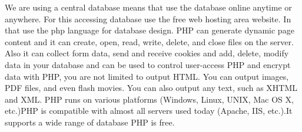 We are using a central database means that use the database online anytime or anywhere. For this accessing database use the free web hosting area website. In that use the php language for database design. PHP can generate dynamic page content and it can create, open, read, write, delete, and close files on the server. Also it can collect form data, send and receive cookies and add, delete, modify data in your database and can be used to control user-access PHP and encrypt data with PHP, you are not limited to output HTML. You can output images, PDF files, and even flash movies. You can also output any text, such as XHTML and XML. PHP runs on various platforms (Windows, Linux, UNIX, Mac OS X, etc.)PHP is compatible with almost all servers used today (Apache, IIS, etc.).It supports a wide range of database PHP is free. 












